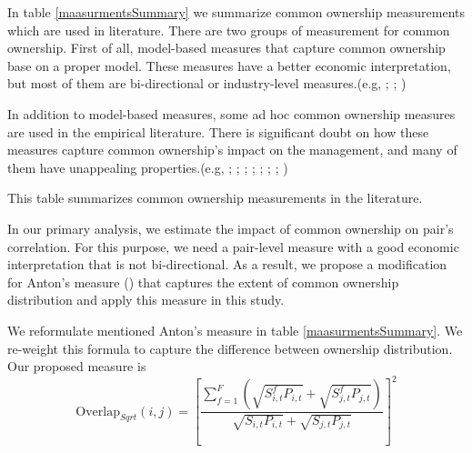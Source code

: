In table \ref{maasurmentsSummary} we summarize common ownership measurements which are used in literature. There are two groups of measurement for common ownership.
First of all, model-based measures that capture common ownership base on a proper  model. These measures have a better economic interpretation, but most of them are bi-directional or industry-level measures.(e.g, \cite{harford2011institutional}; \cite{azar2018anticompetitive}; \cite{gilje2020s})

In addition to model-based measures, some ad hoc common ownership measures are used in the empirical literature. There is significant doubt on how these measures capture common ownership's impact on the management, and many of them have unappealing properties.(e.g, \cite{AntonPolk}; \cite{azar2011new}; \cite{freeman2019effects}; \cite{hansen1996externalities};  \cite{he2017product}; \cite{he2019internalizing}; \cite{lewellen2021does}; \cite{newham2018common})
	{\begin{table}[htbp]
			\centering
			\scriptsize
			\caption{ This table summarizes common ownership measurements in the literature.}
			\label{maasurmentsSummary}
			\resizebox{\textwidth}{!}{
				
			}
		\end{table}
	}
	
In our primary analysis, we estimate the impact of common ownership on pair's correlation. For this purpose, we need a pair-level measure with a good economic interpretation that is not bi-directional. As a result, we propose a modification for Anton's measure (\cite{AntonPolk}) that captures the extent of common ownership distribution and apply this measure in this study.

We reformulate mentioned Anton's measure in table \ref{maasurmentsSummary}.
We re-weight this formula to capture the difference between ownership distribution. Our proposed measure is
\begin{equation}
	\text{Overlap}_{Sqrt}(i, j) =  [\frac{\sum_{f =1}^{F}(\sqrt{S^f_{i,t}P_{i,t}}+\sqrt{S^f_{j,t}P_{j,t}})}{\sqrt{S_{i,t}P_{i,t}} + \sqrt{S_{j,t}P_{j,t}}}]^2 
	\label{sqrt}
\end{equation}

